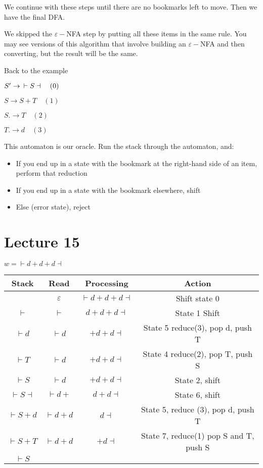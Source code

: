 \documentclass{article}
\begin{document}
We continue with these steps until there are no bookmarks left to move.
Then we have the final DFA.

We skipped the \(\varepsilon-\)NFA step by putting all these items in
the same rule. You may see versions of this algorithm that involve
building an \(\varepsilon-\)NFA and then converting, but the result will
be the same.

Back to the example

\(S' \to \mkern9mu \vdash S \dashv  \quad (0)\)

\(S \to S + T  \quad (1)\)

\(S. \to T  \quad (2)\)

\(T. \to d  \quad (3)\)

This automaton is our oracle. Run the stack through the automaton, and:
\begin{itemize}
    \item If you end up in a state with the bookmark at the right-hand side of an item, perform that reduction 
    \item If you end up in a state with the
bookmark elsewhere, shift 
    \item Else (error state), reject
\end{itemize}


\section{Lecture 15}\label{lecture-15}

\(w = \vdash d + d + d \dashv\)


\begin{table}[H]
    \centering
    \begin{tabular}{|c|c|c|c|} \hline 
         Stack&  Read&  Processing& Action\\ \hline 
         &  $\varepsilon$&  $\vdash d + d  + d \dashv$& Shift state 0\\ \hline 
         $\vdash$&  $\vdash$&  $d + d + d \dashv$& State 1 Shift\\ \hline 
         $\vdash d$&  $\vdash d$&  $+ d + d \dashv$& State 5 reduce(3), pop d, push T\\ \hline 
         $\vdash T$&  $\vdash d$&  $+ d + d \dashv$& State 4 reduce(2), pop T, push S\\ \hline 
         $\vdash S$&  $\vdash d$&  $+ d + d \dashv$& State 2, shift\\ \hline 
         $\vdash S \dashv$&  $\vdash d +$&  $d + d \dashv$& State 6, shift\\ \hline 
         $\vdash S + d$&  $\vdash d + d$&  $d \dashv$& State 5, reduce (3), pop d, push T\\ \hline 
         $\vdash S + T$&  $\vdash d + d$&  $+ d \dashv$& State 7, reduce(1) pop S and T, push S\\ \hline 
         $\vdash S$&  &  & \\\hline
    \end{tabular}
    
\end{table}
\end{document}

